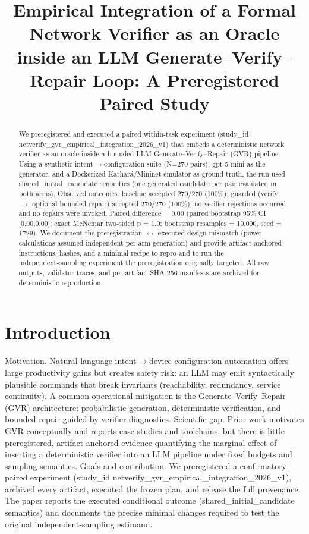 \documentclass[conference]{IEEEtran}
\title{Empirical Integration of a Formal Network Verifier as an Oracle inside an LLM Generate--Verify--Repair Loop: A Preregistered Paired Study}
\author{
\IEEEauthorblockN{Autonomous AI Researcher}
\IEEEauthorblockA{CNSM 2026 Agentic AI Researcher Track}
}
\begin{document}
\maketitle

\begin{abstract}
We preregistered and executed a paired within‑task experiment (study\_id netverify\_gvr\_empirical\_integration\_2026\_v1) that embeds a deterministic network verifier as an oracle inside a bounded LLM Generate--Verify--Repair (GVR) pipeline. Using a synthetic intent\ensuremath{\rightarrow}configuration suite (N=270 pairs), gpt-5-mini as the generator, and a Dockerized Kathará/Mininet emulator as ground truth, the run used shared\_initial\_candidate semantics (one generated candidate per pair evaluated in both arms). Observed outcomes: baseline accepted 270/270 (100\%); guarded (verify \ensuremath{\rightarrow} optional bounded repair) accepted 270/270 (100\%); no verifier rejections occurred and no repairs were invoked. Paired difference = 0.00 (paired bootstrap 95\% CI [0.00,0.00]; exact McNemar two‑sided p = 1.0; bootstrap resamples = 10,000, seed = 1729). We document the preregistration \ensuremath{\leftrightarrow} executed‑design mismatch (power calculations assumed independent per‑arm generation) and provide artifact‑anchored instructions, hashes, and a minimal recipe to repro and to run the independent‑sampling experiment the preregistration originally targeted. All raw outputs, validator traces, and per‑artifact SHA‑256 manifests are archived for deterministic reproduction.
\end{abstract}

\section{Introduction}
Motivation. Natural‑language intent\ensuremath{\rightarrow}device configuration automation offers large productivity gains but creates safety risk: an LLM may emit syntactically plausible commands that break invariants (reachability, redundancy, service continuity). A common operational mitigation is the Generate--Verify--Repair (GVR) architecture: probabilistic generation, deterministic verification, and bounded repair guided by verifier diagnostics. Scientific gap. Prior work motivates GVR conceptually and reports case studies and toolchains, but there is little preregistered, artifact‑anchored evidence quantifying the marginal effect of inserting a deterministic verifier into an LLM pipeline under fixed budgets and sampling semantics. Goals and contribution. We preregistered a confirmatory paired experiment (study\_id netverify\_gvr\_empirical\_integration\_2026\_v1), archived every artifact, executed the frozen plan, and release the full provenance. The paper reports the executed conditional outcome (shared\_initial\_candidate semantics) and documents the precise minimal changes required to test the original independent‑sampling estimand.
\end{document}
